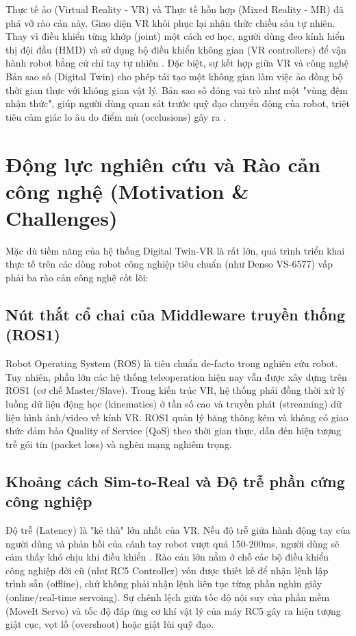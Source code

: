 Thực tế ảo (Virtual Reality - VR) và Thực tế hỗn hợp (Mixed Reality - MR) đã phá vỡ rào cản này. Giao diện VR khôi phục lại nhận thức chiều sâu tự nhiên. Thay vì điều khiển từng khớp (joint) một cách cơ học, người dùng đeo kính hiển thị đội đầu (HMD) và sử dụng bộ điều khiển không gian (VR controllers) để vận hành robot bằng cử chỉ tay tự nhiên \cite{chen2023comparing}. Đặc biệt, sự kết hợp giữa VR và công nghệ Bản sao số (Digital Twin) cho phép tái tạo một không gian làm việc ảo đồng bộ thời gian thực với không gian vật lý. Bản sao số đóng vai trò như một "vùng đệm nhận thức", giúp người dùng quan sát trước quỹ đạo chuyển động của robot, triệt tiêu cảm giác lo âu do điểm mù (occlusions) gây ra \cite{torrejon2026teleoperation}.

\section{Động lực nghiên cứu và Rào cản công nghệ (Motivation \& Challenges)}
Mặc dù tiềm năng của hệ thống Digital Twin-VR là rất lớn, quá trình triển khai thực tế trên các dòng robot công nghiệp tiêu chuẩn (như Denso VS-6577) vấp phải ba rào cản công nghệ cốt lõi:

\subsection{Nút thắt cổ chai của Middleware truyền thống (ROS1)}
Robot Operating System (ROS) là tiêu chuẩn de-facto trong nghiên cứu robot. Tuy nhiên, phần lớn các hệ thống teleoperation hiện nay \cite{kawshan2026digital, chen2023comparing} vẫn được xây dựng trên ROS1 (cơ chế Master/Slave). Trong kiến trúc VR, hệ thống phải đồng thời xử lý luồng dữ liệu động học (kinematics) ở tần số cao và truyền phát (streaming) dữ liệu hình ảnh/video về kính VR. ROS1 quản lý băng thông kém và không có giao thức đảm bảo Quality of Service (QoS) theo thời gian thực, dẫn đến hiện tượng trễ gói tin (packet loss) và nghẽn mạng nghiêm trọng.

\subsection{Khoảng cách Sim-to-Real và Độ trễ phần cứng công nghiệp}
Độ trễ (Latency) là "kẻ thù" lớn nhất của VR. Nếu độ trễ giữa hành động tay của người dùng và phản hồi của cánh tay robot vượt quá 150-200ms, người dùng sẽ cảm thấy khó chịu khi điều khiển \cite{luu2025enhancing}. Rào cản lớn nằm ở chỗ các bộ điều khiển công nghiệp đời cũ (như RC5 Controller) vốn được thiết kế để nhận lệnh lập trình sẵn (offline), chứ không phải nhận lệnh liên tục từng phần nghìn giây (online/real-time servoing). Sự chênh lệch giữa tốc độ nội suy của phần mềm (MoveIt Servo) và tốc độ đáp ứng cơ khí vật lý của máy RC5 gây ra hiện tượng giật cục, vọt lố (overshoot) hoặc giật lùi quỹ đạo.

